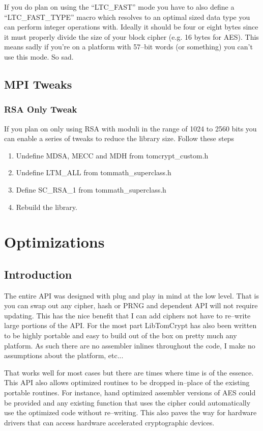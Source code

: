 \documentclass[a4paper]{book}
\begin{document}
If you do plan on using the ``LTC\_FAST'' mode you have to also define a ``LTC\_FAST\_TYPE'' macro which resolves to an optimal sized
data type you can perform integer operations with.  Ideally it should be four or eight bytes since it must properly divide the size 
of your block cipher (e.g. 16 bytes for AES).  This means sadly if you're on a platform with 57--bit words (or something) you can't 
use this mode.  So sad.

\section{MPI Tweaks}
\subsection{RSA Only Tweak}
If you plan on only using RSA with moduli in the range of 1024 to 2560 bits you can enable a series of tweaks
to reduce the library size.  Follow these steps

\begin{enumerate}
   \item Undefine MDSA, MECC and MDH from tomcrypt\_custom.h
   \item Undefine LTM\_ALL  from tommath\_superclass.h
   \item Define SC\_RSA\_1 from tommath\_superclass.h
   \item Rebuild the library.
\end{enumerate}

\chapter{Optimizations}
\section{Introduction}
The entire API was designed with plug and play in mind at the low level.  That is you can swap out any cipher, hash or PRNG and dependent API will not require
updating.  This has the nice benefit that I can add ciphers not have to re--write large portions of the API.  For the most part LibTomCrypt has also been written
to be highly portable and easy to build out of the box on pretty much any platform.  As such there are no assembler inlines throughout the code, I make no assumptions
about the platform, etc...

That works well for most cases but there are times where time is of the essence.  This API also allows optimized routines to be dropped in--place of the existing
portable routines.  For instance, hand optimized assembler versions of AES could be provided and any existing function that uses the cipher could automatically use
the optimized code without re--writing.  This also paves the way for hardware drivers that can access hardware accelerated cryptographic devices.
\end{document}

